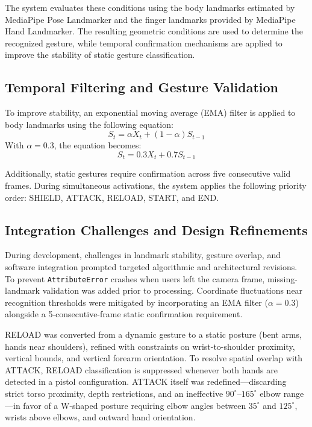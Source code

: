 \documentclass[lettersize,journal]{IEEEtran}
\begin{document}
	The system evaluates these conditions using the body landmarks estimated by MediaPipe Pose Landmarker and the finger landmarks provided by MediaPipe Hand Landmarker. The resulting geometric conditions are used to determine the recognized gesture, while temporal confirmation mechanisms are applied to improve the stability of static gesture classification.
	
	\subsection{Temporal Filtering and Gesture Validation}
	
	To improve stability, an exponential moving average (EMA) filter is applied to body landmarks using the following equation:
	\begin{equation}
		S_t = \alpha X_t + (1 - \alpha)S_{t-1}
	\end{equation} 
	With $\alpha = 0.3$, the equation becomes:
	\begin{equation}
		S_t = 0.3X_t + 0.7S_{t-1}
	\end{equation} 
	
	Additionally, static gestures require confirmation across five consecutive valid frames. During simultaneous activations, the system applies the following priority order: SHIELD, ATTACK, RELOAD, START, and END.

	\subsection{Integration Challenges and Design Refinements}
	
	During development, challenges in landmark stability, gesture overlap, and software integration prompted targeted algorithmic and architectural revisions. To prevent \texttt{AttributeError} crashes when users left the camera frame, missing-landmark validation was added prior to processing. Coordinate fluctuations near recognition thresholds were mitigated by incorporating an EMA filter ($\alpha = 0.3$) alongside a 5-consecutive-frame static confirmation requirement.
	
	RELOAD was converted from a dynamic gesture to a static posture (bent arms, hands near shoulders), refined with constraints on wrist-to-shoulder proximity, vertical bounds, and vertical forearm orientation. 
	To resolve spatial overlap with ATTACK, RELOAD classification is suppressed whenever both hands are detected in a pistol configuration. ATTACK itself was redefined—discarding strict torso proximity, depth restrictions, and an ineffective $90^\circ$–$165^\circ$ elbow range—in favor of a W-shaped posture requiring elbow angles between $35^\circ$ and $125^\circ$, wrists above elbows, and outward hand orientation.
	
\end{document}

